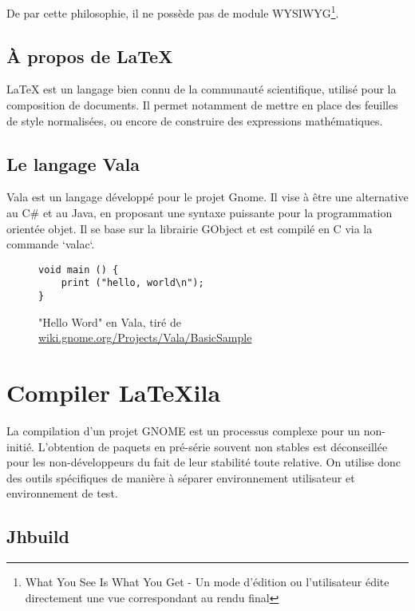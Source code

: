 \documentclass[a4paper,11pt]{report}
\begin{document}
De par cette philosophie, il ne possède pas de module WYSIWYG\footnote{What You See Is What You Get - Un mode d'édition ou l'utilisateur édite directement une vue correspondant au rendu final}.

%


\subsection{À propos de \LaTeX}
LaTeX est un langage bien connu de la communauté scientifique, utilisé pour la composition de documents.
Il permet notamment de mettre en place des feuilles de style normalisées, ou encore de construire des expressions mathématiques.

\subsection{Le langage Vala}
\label{sub:vala}
Vala est un langage développé pour le projet Gnome.
Il vise à être une alternative au C\# et au Java, en proposant une syntaxe puissante pour la programmation orientée objet.
Il se base sur la librairie GObject et est compilé en C via la commande `valac`.

\begin{figure}[h] %
\begin{lstlisting}
void main () {
    print ("hello, world\n");
}
\end{lstlisting}\caption{"Hello Word" en Vala, tiré de \url{wiki.gnome.org/Projects/Vala/BasicSample}}
\end{figure}

\section{Compiler LaTeXila}
\label{cha:compiler}
La compilation d'un projet GNOME est un processus complexe pour un non-initié.
L'obtention de paquets en pré-série souvent non stables est déconseillée pour les non-développeurs du fait de leur stabilité toute relative.
On utilise donc des outils spécifiques de manière à séparer environnement utilisateur et environnement de test. 

\subsection{Jhbuild}
\label{sub:jhbuild}
\end{document}
